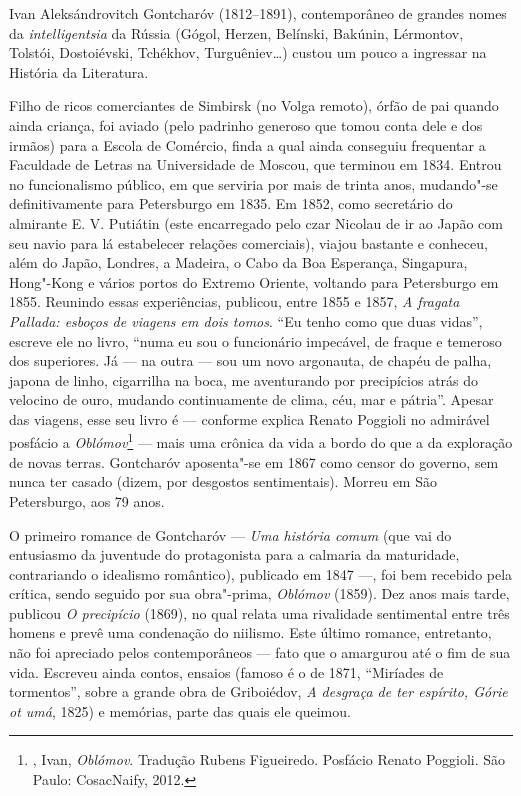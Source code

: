 Ivan Aleksándrovitch Gontcharóv (1812--1891), contemporâneo de grandes nomes  da \emph{intelligentsia} da Rússia (Gógol, Herzen, Belínski, Bakúnin, Lérmontov, Tolstói, Dostoiévski, Tchékhov, Turguêniev\ldots{}) custou um pouco a ingressar na História da Literatura. 

Filho de ricos comerciantes de Simbirsk (no Volga remoto), órfão de pai quando ainda criança, foi aviado (pelo padrinho generoso que tomou conta dele e dos irmãos) para a Escola de Comércio, finda a qual ainda conseguiu frequentar a Faculdade de Letras na Universidade de Moscou, que terminou em 1834. Entrou no funcionalismo público, em que serviria por mais de trinta anos, mudando"-se definitivamente para Petersburgo em 1835. Em 1852, como secretário do almirante E. V. Putiátin (este encarregado pelo czar Nicolau  de ir ao Japão com seu navio para lá estabelecer relações comerciais), viajou bastante e conheceu, além do Japão, Londres, a Madeira, o Cabo da Boa Esperança, Singapura, Hong"-Kong e vários portos do Extremo Oriente, voltando  para Petersburgo em 1855. Reunindo essas experiências, publicou, entre 1855 e 1857,  \emph{A fragata Pallada: esboços de viagens em dois tomos}. ``Eu tenho como que duas vidas'', escreve ele no livro, ``numa eu sou o funcionário impecável, de fraque e temeroso dos superiores. Já --- na outra --- sou um novo argonauta, de chapéu de palha, japona de linho, cigarrilha na boca, me aventurando por precipícios atrás do velocino de ouro, mudando continuamente de clima, céu, mar e pátria''. Apesar das viagens, esse seu livro é --- conforme explica Renato Poggioli no admirável posfácio a \emph{Oblómov}\footnote{, Ivan, \emph{Oblómov}. Tradução Rubens Figueiredo. Posfácio Renato Poggioli. São Paulo: CosacNaify, 2012.} --- mais uma crônica da vida a bordo do que a da exploração de novas terras. Gontcharóv aposenta"-se em 1867 como censor do governo, sem nunca ter casado (dizem, por desgostos sentimentais). Morreu em São Petersburgo, aos 79 anos. 

O primeiro romance  de Gontcharóv --- \emph{Uma história comum} (que vai do entusiasmo da juventude do protagonista para a calmaria da maturidade, contrariando o idealismo romântico), publicado em 1847 ---, foi bem recebido pela crítica, sendo seguido por sua obra"-prima, \emph{Oblómov} (1859). Dez anos mais tarde, publicou \emph{O precipício} (1869), no qual relata uma rivalidade sentimental entre três homens e prevê uma condenação do niilismo. Este último romance, entretanto, não foi apreciado pelos contemporâneos --- fato que o amargurou até o fim de sua vida. Escreveu ainda contos, ensaios (famoso é o de 1871, ``Miríades de tormentos'', sobre a grande obra de Griboiédov, \emph{A desgraça de ter espírito, Górie ot umá}, 1825) e memórias, parte das quais ele queimou. 


